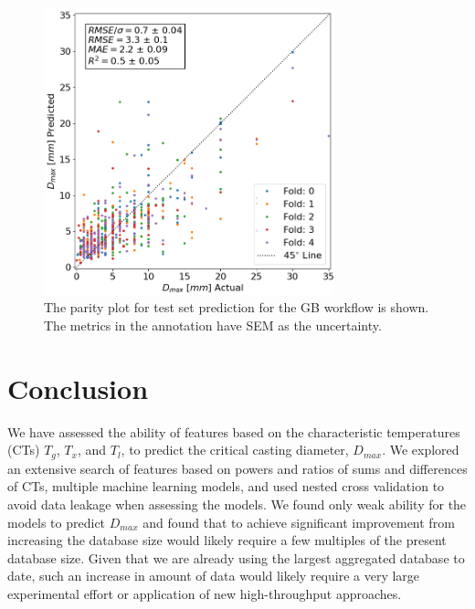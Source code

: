 \documentclass[11pt,a4paper]{article}
\begin{document}
\begin{figure}[H]
\centering
\includegraphics[width=0.75\textwidth]{figures/parity.png}
\caption{The parity plot for test set prediction for the GB workflow is shown. The metrics in the annotation have SEM as the uncertainty.}
\label{parity}
\end{figure}

\section{Conclusion}

\par
We have assessed the ability of features based on the characteristic temperatures (CTs) $T_{g}$, $T_{x}$, and $T_{l}$, to predict the critical casting diameter, $D_{max}$. We explored an extensive search of features based on powers and ratios of sums and differences of CTs, multiple machine learning models, and used nested cross validation to avoid data leakage when assessing the models. We found only weak ability for the models to predict  $D_{max}$ and found that to achieve significant improvement from increasing the database size would likely require a few multiples of the present database size. Given that we are already using the largest aggregated database to date, such an increase in amount of data would likely require a very large experimental effort or application of new high-throughput approaches.
\end{document}
